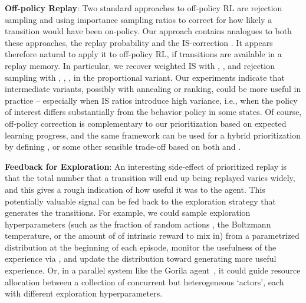\documentclass[a4paper]{article}
\begin{document}
{\bf Off-policy Replay}: 
Two standard approaches to off-policy RL are rejection sampling and using importance sampling 
ratios  to correct for how likely a transition would have been on-policy.
Our approach contains analogues to both these approaches, the replay probability  and the IS-correction .
It appears therefore natural to apply it to off-policy RL, if transitions are available in a replay memory.
In particular, we recover weighted IS with , ,  and 
rejection sampling with , , , in the proportional variant.
Our experiments indicate that intermediate variants, possibly with annealing or ranking, could be more useful
in practice -- especially when IS ratios introduce high variance, i.e., when the policy of interest
differs substantially from the behavior policy in some states.
Of course, off-policy correction is complementary to our prioritization based on expected learning progress,
and the same framework can be used for a hybrid prioritization by defining , 
or some other sensible trade-off based on both  and .



{\bf Feedback for Exploration}: 
An interesting side-effect of prioritized replay is that the total number  that a transition will end up being replayed varies widely, 
and this gives a rough indication of how useful it was to the agent.
This potentially valuable signal can be fed back to the exploration strategy that generates the transitions. 
For example, we could sample exploration hyperparameters 
(such as the fraction of random actions , the Boltzmann temperature, or the amount of of intrinsic reward to mix in) 
from a parametrized distribution at the beginning of each episode, monitor the usefulness of the experience via , and update 
the distribution toward generating more useful experience.
Or, in a parallel system like the Gorila agent~\citep{gorila},
it could guide resource allocation between a collection of concurrent but heterogeneous `actors', each with different exploration hyperparameters.


\label{sec-prio-memory}
\end{document}
